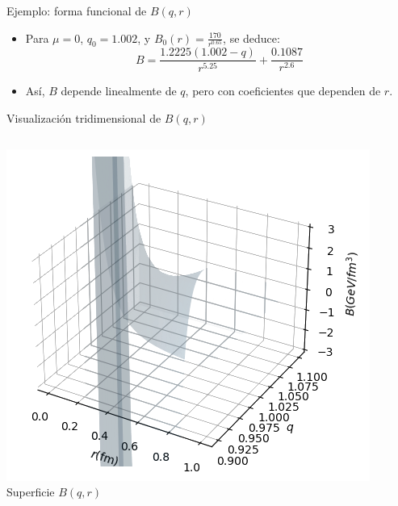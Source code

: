 \documentclass{beamer}
\begin{document}
\begin{frame}{Ejemplo: forma funcional de \( B(q, r) \)}
  \begin{itemize}
    \item Para \( \mu = 0 \), \( q_0 = 1.002 \), y \( B_0(r) = \frac{170}{r^{0.65}} \), se deduce:
    \[
      B = \frac{1.2225 (1.002 - q)}{r^{5.25}} + \frac{0.1087}{r^{2.6}}
    \]
    \item Así, \( B \) depende linealmente de \( q \), pero con coeficientes que dependen de \( r \).
  \end{itemize}
\end{frame}

\begin{frame}{Visualización tridimensional de \( B(q, r) \)}
  \begin{columns}
    \includegraphics[width=\linewidth]{figures/B(q,r).png}
    \vspace{0.1cm}
    \centering \scriptsize{Superficie \( B(q, r) \)}


\end{columns}
\end{frame}
\end{document}
